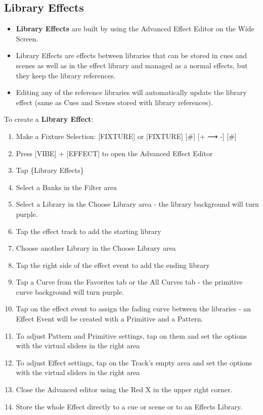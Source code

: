 \documentclass[
]{article}
\begin{document}
\hypertarget{Library-Effects-9.6}{%
\subsection{Library Effects}\label{Library-Effects-9.6}}

\begin{itemize}
\item
  \textbf{Library Effects} are built by using the Advanced Effect Editor on the Wide Screen.
\item
  Library Effects are effects between libraries that can be stored in cues and scenes as well as in the effect library and managed as a normal effects, but they keep the library references.
\item
  Editing any of the reference libraries will automatically update the library effect (same as Cues and Scenes stored with library references).
\end{itemize}

To create a \textbf{Library Effect}:

\begin{enumerate}
\def\labelenumi{\arabic{enumi}.}
\item
  Make a Fixture Selection: {[}FIXTURE{]} or {[}FIXTURE{]} {[}\#{]} {[}+ ⟶ -{]} {[}\#{]}
\item
  Press {[}VIBE{]} + {[}EFFECT{]} to open the Advanced Effect Editor
\item
  Tap \{Library Effects\}
\item
  Select a Banks in the Filter area
\item
  Select a Library in the Choose Library area - the library background will turn purple.
\item
  Tap the effect track to add the starting library
\item
  Choose another Library in the Choose Library area
\item
  Tap the right side of the effect event to add the ending library
\item
  Tap a Curve from the Favorites tab or the All Curves tab - the primitive curve background will turn purple.
\item
  Tap on the effect event to assign the fading curve between the libraries - an Effect Event will be created with a Primitive and a Pattern.
\item
  To adjust Pattern and Primitive settings, tap on them and set the options with the virtual sliders in the right area
\item
  To adjust Effect settings, tap on the Track's empty area and set the options with the virtual sliders in the right area
\item
  Close the Advanced editor using the Red X in the upper right corner.
\item
  Store the whole Effect directly to a cue or scene or to an Effects Library.
\end{enumerate}
\end{document}
